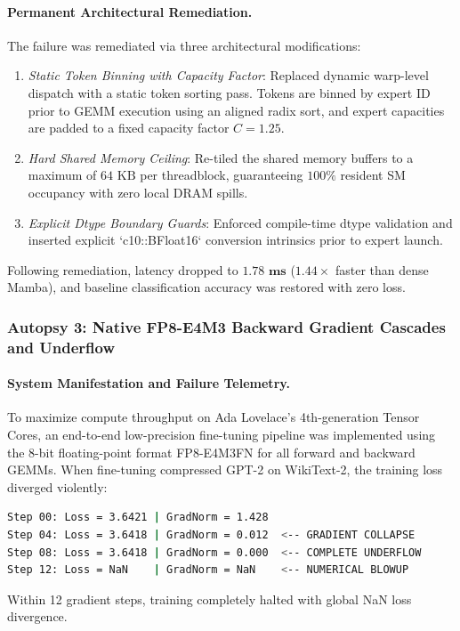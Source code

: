\paragraph{Permanent Architectural Remediation.}
The failure was remediated via three architectural modifications:
\begin{enumerate}
    \item \emph{Static Token Binning with Capacity Factor}: Replaced dynamic warp-level dispatch with a static token sorting pass. Tokens are binned by expert ID prior to GEMM execution using an aligned radix sort, and expert capacities are padded to a fixed capacity factor $C = 1.25$.
    \item \emph{Hard Shared Memory Ceiling}: Re-tiled the shared memory buffers to a maximum of $64\text{ KB}$ per threadblock, guaranteeing $100\%$ resident SM occupancy with zero local DRAM spills.
    \item \emph{Explicit Dtype Boundary Guards}: Enforced compile-time dtype validation and inserted explicit `c10::BFloat16` conversion intrinsics prior to expert launch.
\end{enumerate}
Following remediation, latency dropped to $\mathbf{1.78\text{ ms}}$ ($1.44\times$ faster than dense Mamba), and baseline classification accuracy was restored with zero loss.

\subsubsection{Autopsy 3: Native FP8-E4M3 Backward Gradient Cascades and Underflow}
\label{sec:autopsy_fp8_underflow}

\paragraph{System Manifestation and Failure Telemetry.}
To maximize compute throughput on Ada Lovelace's 4th-generation Tensor Cores, an end-to-end low-precision fine-tuning pipeline was implemented using the 8-bit floating-point format FP8-E4M3FN for all forward and backward GEMMs. When fine-tuning compressed GPT-2 on WikiText-2, the training loss diverged violently:
\begin{lstlisting}[language=bash]
Step 00: Loss = 3.6421 | GradNorm = 1.428
Step 04: Loss = 3.6418 | GradNorm = 0.012  <-- GRADIENT COLLAPSE
Step 08: Loss = 3.6418 | GradNorm = 0.000  <-- COMPLETE UNDERFLOW
Step 12: Loss = NaN    | GradNorm = NaN    <-- NUMERICAL BLOWUP
\end{lstlisting}
Within 12 gradient steps, training completely halted with global NaN loss divergence.

